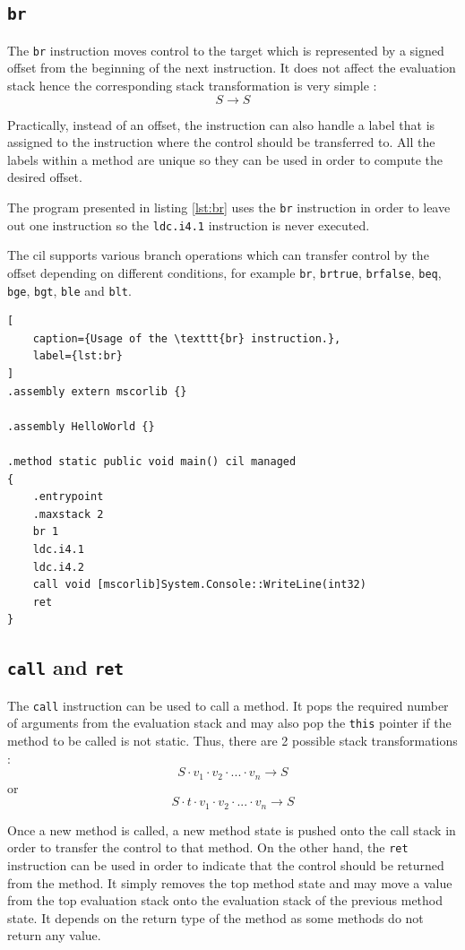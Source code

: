 \documentclass[declaration,shortabstract,english,mgr]{iithesis}
\begin{document}
\subsection{\texttt{br}}

The \texttt{br} instruction moves control to the target which is represented by a signed offset from the beginning of the next instruction. It does not affect the evaluation stack hence the corresponding stack transformation is very simple \cite{ecmaStandard}:
$$
	S \rightarrow S
$$

Practically, instead of an offset, the instruction can also handle a label that is assigned to the instruction where the control should be transferred to. All the labels within a method are unique so they can be used in order to compute the desired offset.

The program presented in listing \ref{lst:br} uses the \texttt{br} instruction in order to leave out one instruction so the \texttt{ldc.i4.1} instruction is never executed.

The \acrshort{cil} supports various branch operations which can transfer control by the offset depending on different conditions, for example \texttt{br}, \texttt{brtrue}, \texttt{brfalse}, \texttt{beq}, \texttt{bge}, \texttt{bgt}, \texttt{ble} and \texttt{blt}.

\begin{lstlisting}[
	caption={Usage of the \texttt{br} instruction.},
	label={lst:br}
]
.assembly extern mscorlib {}

.assembly HelloWorld {}

.method static public void main() cil managed
{
	.entrypoint
	.maxstack 2
	br 1
	ldc.i4.1
	ldc.i4.2
	call void [mscorlib]System.Console::WriteLine(int32)
	ret
}
\end{lstlisting}

\subsection{\texttt{call} and \texttt{ret}}

The \texttt{call} instruction can be used to call a method. It pops the required number of arguments from the evaluation stack and may also pop the \texttt{this} pointer if the method to be called is not static. Thus, there are 2 possible stack transformations \cite{ecmaStandard}:
$$
	S \cdot v_1 \cdot v_2 \cdot ... \cdot v_n \rightarrow S
$$
or
$$
	S \cdot t \cdot v_1 \cdot v_2 \cdot ... \cdot v_n \rightarrow S
$$

Once a new method is called, a new method state is pushed onto the call stack in order to transfer the control to that method. On the other hand, the \texttt{ret} instruction can be used in order to indicate that the control should be returned from the method. It simply removes the top method state and may move a value from the top evaluation stack onto the evaluation stack of the previous method state. It depends on the return type of the method as some methods do not return any value.
\end{document}
